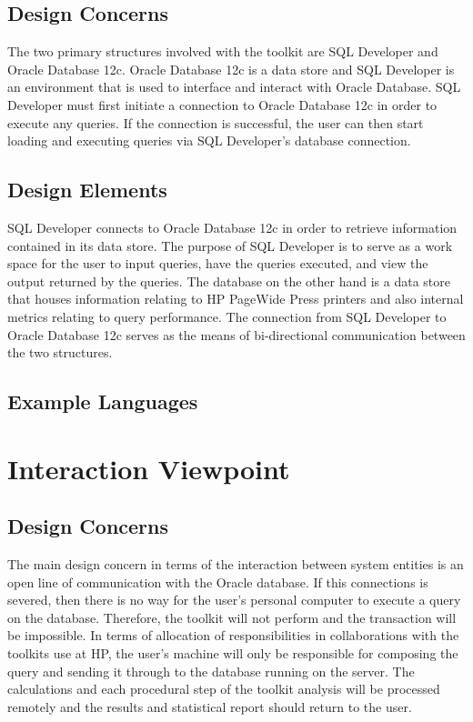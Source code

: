 \documentclass[draftclsnofoot, onecolumn, compsoc, 10pt]{IEEEtran}
\begin{document}
\subsection{Design Concerns}
The two primary structures involved with the toolkit are SQL Developer and Oracle Database 12c.
Oracle Database 12c is a data store and SQL Developer is an environment that is used to interface and interact with Oracle Database.
SQL Developer must first initiate a connection to Oracle Database 12c in order to execute any queries.
If the connection is successful, the user can then start loading and executing queries via SQL Developer's database connection.

\subsection{Design Elements}
SQL Developer connects to Oracle Database 12c in order to retrieve information contained in its data store.
The purpose of SQL Developer is to serve as a work space for the user to input queries, have the queries executed, and view the output returned by the queries.
The database on the other hand is a data store that houses information relating to HP PageWide Press printers and also internal metrics relating to query performance.
The connection from SQL Developer to Oracle Database 12c serves as the means of bi-directional communication between the two structures.
\subsection{Example Languages}


\section{Interaction Viewpoint}

\subsection{Design Concerns}
The main design concern in terms of the interaction between system entities is an open line of communication with the Oracle database.
If this connections is severed, then there is no way for the user's personal computer to execute a query on the database.
Therefore, the toolkit will not perform and the transaction will be impossible. 
In terms of allocation of responsibilities in collaborations with the toolkits use at HP, the user's machine will only be responsible for composing the query and sending it through to the database running on the server.
The calculations and each procedural step of the toolkit analysis will be processed remotely and the results and statistical report should return to the user.
\end{document}
